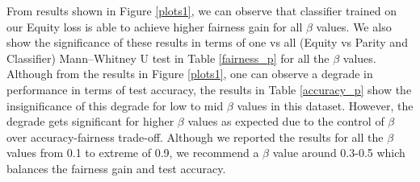 From results shown in Figure \ref{plots1}, we can observe that classifier trained on our Equity loss is able to achieve higher fairness gain for all $\beta$ values. We also show the significance of these results in terms of one vs all (Equity vs Parity and Classifier) Mann–Whitney U test in Table \ref{fairness_p} for all the $\beta$ values. Although from the results in Figure \ref{plots1}, one can observe a degrade in performance in terms of test accuracy, the results in Table \ref{accuracy_p} show the insignificance of this degrade for low to mid $\beta$ values in this dataset. However, the degrade gets significant for higher $\beta$ values as expected due to the control of $\beta$ over accuracy-fairness trade-off. Although we reported the results for all the $\beta$ values from 0.1 to extreme of 0.9, we recommend a $\beta$ value around 0.3-0.5 which balances the fairness gain and test accuracy.
